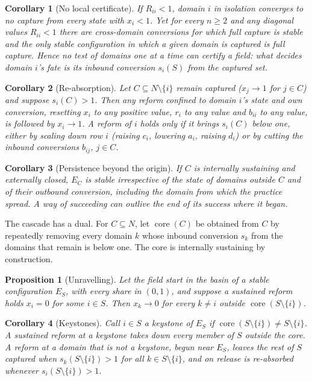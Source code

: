 \documentclass[letterpaper]{article} %
\newtheorem{proposition}{Proposition}
\newtheorem{corollary}{Corollary}
\theoremstyle{definition}
\begin{document}
\begin{corollary}[No local certificate]\label{cor:local}
If $R_{ii}<1$, domain $i$ in isolation converges to no capture from every state with $x_i<1$. Yet for every $n\ge2$ and any diagonal values $R_{ii}<1$ there are cross-domain conversions for which full capture is stable and the only stable configuration in which a given domain is captured is full capture. Hence no test of domains one at a time can certify a field: what decides domain $i$'s fate is its inbound conversion $s_i(S)$ from the captured set.
\end{corollary}

\begin{corollary}[Re-absorption]\label{cor:reabsorb}
Let $C\subseteq N\setminus\{i\}$ remain captured ($x_j\to1$ for $j\in C$) and suppose $s_i(C)>1$. Then any reform confined to domain $i$'s state and own conversion, resetting $x_i$ to any positive value, $r_i$ to any value and $b_{ii}$ to any value, is followed by $x_i\to1$. A reform of $i$ holds only if it brings $s_i(C)$ below one, either by scaling down row $i$ (raising $c_i$, lowering $a_i$, raising $d_i$) or by cutting the inbound conversions $b_{ij}$, $j\in C$.
\end{corollary}

\begin{corollary}[Persistence beyond the origin]\label{cor:origin}
If $C$ is internally sustaining and externally closed, $E_C$ is stable irrespective of the state of domains outside $C$ and of their outbound conversion, including the domain from which the practice spread. A way of succeeding can outlive the end of its success where it began.
\end{corollary}

The cascade has a dual. For $C\subseteq N$, let $\operatorname{core}(C)$ be obtained from $C$ by repeatedly removing every domain $k$ whose inbound conversion $s_k$ from the domains that remain is below one. The core is internally sustaining by construction.

\begin{proposition}[Unravelling]\label{prop:unravel}
Let the field start in the basin of a stable configuration $E_S$, with every share in $(0,1)$, and suppose a sustained reform holds $x_i=0$ for some $i\in S$. Then $x_k\to0$ for every $k\neq i$ outside $\operatorname{core}(S\setminus\{i\})$.
\end{proposition}

\begin{corollary}[Keystones]\label{cor:keystone}
Call $i\in S$ a \emph{keystone} of $E_S$ if $\operatorname{core}(S\setminus\{i\})\neq S\setminus\{i\}$. A sustained reform at a keystone takes down every member of $S$ outside the core. A reform at a domain that is not a keystone, begun near $E_S$, leaves the rest of $S$ captured when $s_k(S\setminus\{i\})>1$ for all $k\in S\setminus\{i\}$, and on release is re-absorbed whenever $s_i(S\setminus\{i\})>1$.
\end{corollary}
\end{document}
